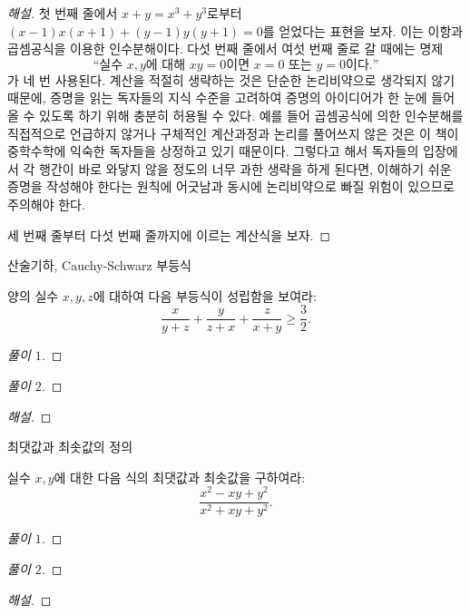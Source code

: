 \documentclass{../../large}
\begin{document}
\begin{proof}[해설]
첫 번째 줄에서 $x+y=x^3+y^3$로부터 $(x-1)x(x+1)+(y-1)y(y+1)=0$를 얻었다는 표현을 보자.
이는 이항과 곱셈공식을 이용한 인수분해이다.
다섯 번째 줄에서 여섯 번째 줄로 갈 때에는 명제
\[\text{``실수 $x,y$에 대해 $xy=0$이면 $x=0$ 또는 $y=0$이다.''}\]
가 네 번 사용된다.
계산을 적절히 생략하는 것은 단순한 논리비약으로 생각되지 않기 때문에, 증명을 읽는 독자들의 지식 수준을 고려하여 증명의 아이디어가 한 눈에 들어올 수 있도록 하기 위해 충분히 허용될 수 있다.
예를 들어 곱셈공식에 의한 인수분해를 직접적으로 언급하지 않거나 구체적인 계산과정과 논리를 풀어쓰지 않은 것은 이 책이 중학수학에 익숙한 독자들을 상정하고 있기 때문이다.
그렇다고 해서 독자들의 입장에서 각 행간이 바로 와닿지 않을 정도의 너무 과한 생략을 하게 된다면, 이해하기 쉬운 증명을 작성해야 한다는 원칙에 어긋남과 동시에 논리비약으로 빠질 위험이 있으므로 주의해야 한다.

세 번째 줄부터 다섯 번째 줄까지에 이르는 계산식을 보자.




\end{proof}



산술기하, Cauchy-Schwarz 부등식

\begin{example}
양의 실수 $x,y,z$에 대하여 다음 부등식이 성립함을 보여라:
\[\frac x{y+z}+\frac y{z+x}+\frac z{x+y}\ge\frac32.\]
\end{example}
\begin{linenumbers*}
\begin{proof}[풀이 $1$]
\end{proof}
\end{linenumbers*}
\begin{linenumbers*}
\begin{proof}[풀이 $2$]
\end{proof}
\end{linenumbers*}
\begin{proof}[해설]
\end{proof}



최댓값과 최솟값의 정의

\begin{example}
실수 $x,y$에 대한 다음 식의 최댓값과 최솟값을 구하여라:
\[\frac{x^2-xy+y^2}{x^2+xy+y^2}.\]
\end{example}
\begin{linenumbers*}
\begin{proof}[풀이 $1$]
\end{proof}
\end{linenumbers*}
\begin{linenumbers*}
\begin{proof}[풀이 $2$]
\end{proof}
\end{linenumbers*}
\begin{proof}[해설]
\end{proof}
\end{document}
